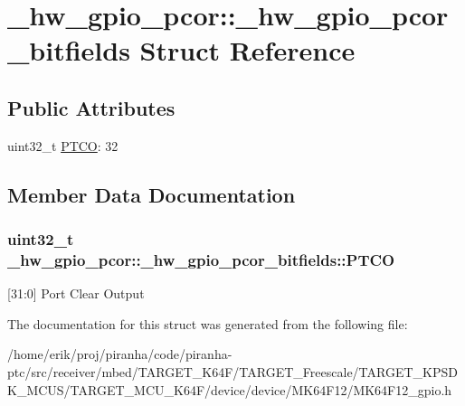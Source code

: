 \hypertarget{struct__hw__gpio__pcor_1_1__hw__gpio__pcor__bitfields}{}\section{\+\_\+hw\+\_\+gpio\+\_\+pcor\+:\+:\+\_\+hw\+\_\+gpio\+\_\+pcor\+\_\+bitfields Struct Reference}
\label{struct__hw__gpio__pcor_1_1__hw__gpio__pcor__bitfields}
\subsection*{Public Attributes}
\begin{DoxyCompactItemize}
\item 
uint32\+\_\+t \hyperlink{struct__hw__gpio__pcor_1_1__hw__gpio__pcor__bitfields_ad3d611870efc9b721a6ddf998b7a8232}{P\+T\+CO}\+: 32
\end{DoxyCompactItemize}


\subsection{Member Data Documentation}
\subsubsection[{\texorpdfstring{P\+T\+CO}{PTCO}}]{\setlength{\rightskip}{0pt plus 5cm}uint32\+\_\+t \+\_\+hw\+\_\+gpio\+\_\+pcor\+::\+\_\+hw\+\_\+gpio\+\_\+pcor\+\_\+bitfields\+::\+P\+T\+CO}\hypertarget{struct__hw__gpio__pcor_1_1__hw__gpio__pcor__bitfields_ad3d611870efc9b721a6ddf998b7a8232}{}\label{struct__hw__gpio__pcor_1_1__hw__gpio__pcor__bitfields_ad3d611870efc9b721a6ddf998b7a8232}
\mbox{[}31\+:0\mbox{]} Port Clear Output 

The documentation for this struct was generated from the following file\+:\begin{DoxyCompactItemize}
\item 
/home/erik/proj/piranha/code/piranha-\/ptc/src/receiver/mbed/\+T\+A\+R\+G\+E\+T\+\_\+\+K64\+F/\+T\+A\+R\+G\+E\+T\+\_\+\+Freescale/\+T\+A\+R\+G\+E\+T\+\_\+\+K\+P\+S\+D\+K\+\_\+\+M\+C\+U\+S/\+T\+A\+R\+G\+E\+T\+\_\+\+M\+C\+U\+\_\+\+K64\+F/device/device/\+M\+K64\+F12/M\+K64\+F12\+\_\+gpio.\+h\end{DoxyCompactItemize}
